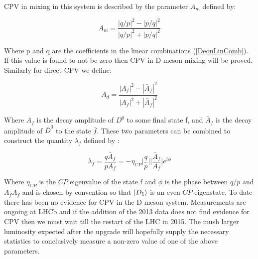CPV in mixing in this system is described by the parameter $A_{m}$ defined by:

\begin{equation*}
A_{m} = \frac{|q/p|^{2} - |p/q|^{2}}{|q/p|^{2} + |p/q|^{2}}
\end{equation*}

\noindent Where p and q are the coefficients in the linear combinations (\ref{DeonLinComb}). If this value is found to not be zero then CPV in D meson mixing will be proved. Similarly for direct CPV we define:

\begin{equation*}
A_{d} = \frac{|A_{f}|^{2} - |\bar{A}_{f}|^{2}}{|A_{f}|^{2} + |\bar{A}_{f}|^{2}}
\end{equation*}

\noindent Where $A_{f}$ is the decay amplitude of $D^{0}$ to some final state f, and $\bar{A}_{f}$ is the decay amplitude of $\bar{D}^{0}$ to the state $\bar{f}$. These two parameters can be combined to construct the quantity $\lambda_{f}$ defined by \cite{LHCbAsymmetry}:

\begin{equation*}
\lambda_{f} = \frac{q \bar{A}_{f}}{p A_{f}} = - \eta_{CP} \bigg|\frac{q}{p}\bigg| \bigg|\frac{\bar{A}_{f}}{A_{f}}\bigg| e^{i \phi}
\end{equation*}

\noindent Where $\eta_{CP}$ is the $CP$ eigenvalue of the state f and $\phi$ is the phase between $q/p$ and ${\bar{A}_{f}}{A_{f}}$ and is chosen by convention so that $\ket{D_{1}}$ is an even $CP$ eigenstate. To date there has been no evidence for CPV in the D meson system. Measurements are ongoing at LHCb and if the addition of the 2013 data does not find evidence for CPV then we must wait till the restart of the LHC in 2015. The mush larger luminosity expected after the upgrade will hopefully supply the necessary statistics to conclusively measure a non-zero value of one of the above parameters. 






